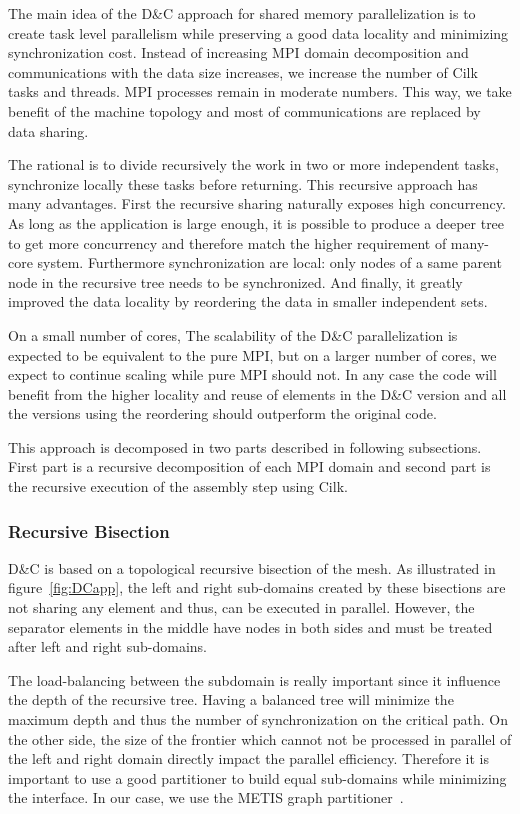 \documentclass{IOS-Book-Article}
\begin{document}
The main idea of the D\&C approach for shared memory parallelization is to create task level parallelism while preserving a good data locality and minimizing synchronization cost.
Instead of increasing MPI domain decomposition and communications with the data size increases, we increase the number of Cilk tasks and threads. MPI processes remain
in moderate numbers. This way, we take benefit of the machine topology and most of communications are replaced by data sharing.

The rational is to divide recursively the work in two or more independent tasks, synchronize locally these tasks before returning. This recursive approach has many advantages.
First the recursive sharing naturally exposes high concurrency. As long as the application is large enough, it is possible to produce a deeper tree to get more concurrency and 
therefore match the higher requirement of many-core system. Furthermore synchronization are local: only nodes of a same parent node in the recursive
tree needs to be synchronized. And finally, it greatly improved the data locality by reordering the data in smaller independent sets. 

On a small number of cores,  The scalability of the D\&C parallelization is expected to be equivalent to the pure MPI, but on a larger number of cores, we expect to continue scaling
while pure MPI should not. In any case the code will benefit from the higher locality and reuse of elements in the D\&C version and all the versions using the reordering should outperform the original code.

This approach is decomposed in two parts described in following subsections.
First part is a recursive decomposition of each MPI domain and second part is the recursive execution of the assembly step using Cilk.

\subsubsection{Recursive Bisection}
\label{sec:DCrec}
D\&C is based on a topological recursive bisection of the mesh.
As illustrated in figure~\ref{fig:DCapp}, the left and right sub-domains created by these bisections are not sharing any element and thus, can be executed in parallel.
However, the separator elements in the middle have nodes in both sides and must be treated after left and right sub-domains.

The load-balancing between the subdomain is really important since it influence the depth of the recursive tree. Having a balanced tree will minimize the maximum depth and thus the number of synchronization on the critical path. On the other side, the size of the frontier which cannot not be processed in parallel of the left and right domain directly impact the parallel efficiency.
Therefore it is important to use a good partitioner to build equal sub-domains while minimizing the interface. In our case, we use the METIS graph partitioner~\cite{Metis}.
\end{document}
